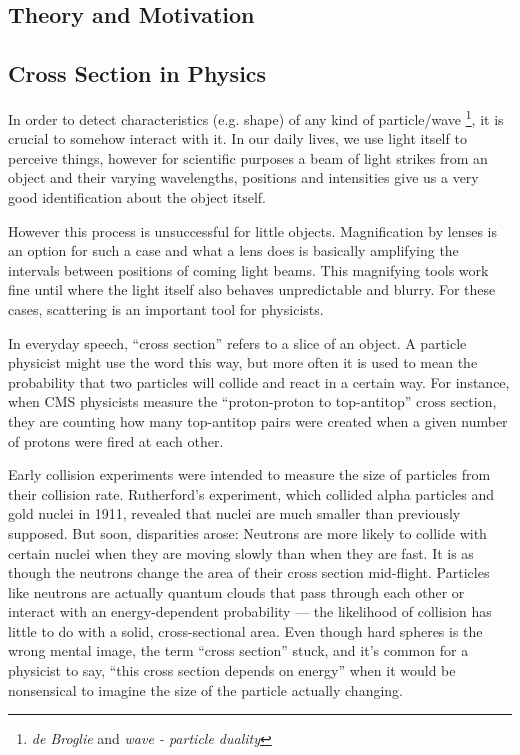 \documentclass[a4paper]{article}
\begin{document}
\begin{multicols}{2}
\section{Theory and Motivation}

\subsection{Cross Section in Physics}

In order to detect characteristics (e.g. shape) of any kind of particle/wave \footnote{\textit{de Broglie} and \textit{wave - particle duality}}, it is crucial to somehow interact with it. In our daily lives, we use light itself to perceive things, however for scientific purposes a beam of light strikes from an object and their varying wavelengths, positions and intensities give us a very good identification about the object itself. 

However this process is unsuccessful for little objects. Magnification by lenses is an option for such a case and what a lens does is basically amplifying the intervals between positions of coming light beams. This magnifying tools work fine until where the light itself also behaves unpredictable and blurry. For these  cases, scattering is an important tool for physicists.

In everyday speech, “cross section” refers to a slice of an object. A particle physicist might use the word this way, but more often it is used to mean the probability that two particles will collide and react in a certain way. For instance, when CMS physicists measure the “proton-proton to top-antitop” cross section, they are counting how many top-antitop pairs were created when a given number of protons were fired at each other.

Early collision experiments were intended to measure the size of particles from their collision rate. Rutherford’s experiment, which collided alpha particles and gold nuclei in 1911, revealed that nuclei are much smaller than previously supposed. But soon, disparities arose: Neutrons are more likely to collide with certain nuclei when they are moving slowly than when they are fast. It is as though the neutrons change the area of their cross section mid-flight. Particles like neutrons are actually quantum clouds that pass through each other or interact with an energy-dependent probability — the likelihood of collision has little to do with a solid, cross-sectional area. Even though hard spheres is the wrong mental image, the term “cross section” stuck, and it’s common for a physicist to say, “this cross section depends on energy” when it would be nonsensical to imagine the size of the particle actually changing.\cite{CERN}


\end{multicols}
\end{document}
